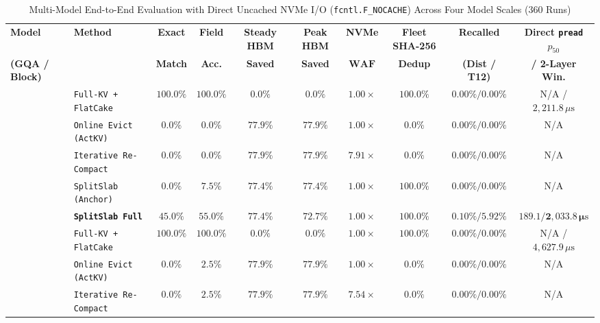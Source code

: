 \documentclass[final,5p,times,twocolumn]{elsarticle}
\theoremstyle{definition}
\theoremstyle{remark}
\newcommand{\WAF}{\operatorname{WAF}}
\begin{document}
\begin{table}[!t]
\centering
\caption{Multi-Model End-to-End Evaluation with Direct Uncached NVMe I/O (\texttt{fcntl.F\_NOCACHE}) Across Four Model Scales ($360$ Runs)}
\label{tab:multimodel}
\footnotesize
\renewcommand{\arraystretch}{1.12}
\setlength{\tabcolsep}{3.0pt}
\begin{tabular}{@{}llcccccccc@{}}
\toprule
\textbf{Model} & \textbf{Method} & \textbf{Exact} & \textbf{Field} & \textbf{Steady HBM} & \textbf{Peak HBM} & \textbf{NVMe} & \textbf{Fleet SHA-256} & \textbf{Recalled} & \textbf{Direct \texttt{pread} $p_{50}$} \\
\textbf{(GQA / Block)} & & \textbf{Match} & \textbf{Acc.} & \textbf{Saved} & \textbf{Saved} & $\mathbf{\WAF}$ & \textbf{Dedup} & \textbf{(Dist / T12)} & \textbf{/ 2-Layer Win.} \\
\midrule
{}
 & \texttt{Full-KV + FlatCake} & $100.0\%$ & $100.0\%$ & $0.0\%$ & $0.0\%$ & $1.00\times$ & $100.0\%$ & $0.00\% / 0.00\%$ & N/A / $2{,}211.8\,\mu\mathrm{s}$ \\
 & \texttt{Online Evict (ActKV)} & $0.0\%$ & $0.0\%$ & $77.9\%$ & $77.9\%$ & $1.00\times$ & $0.0\%$ & $0.00\% / 0.00\%$ & N/A \\
 & \texttt{Iterative Re-Compact} & $0.0\%$ & $0.0\%$ & $77.9\%$ & $77.9\%$ & $7.91\times$ & $0.0\%$ & $0.00\% / 0.00\%$ & N/A \\
 & \texttt{SplitSlab (Anchor)} & $0.0\%$ & $7.5\%$ & $77.4\%$ & $77.4\%$ & $1.00\times$ & $100.0\%$ & $0.00\% / 0.00\%$ & N/A \\
 & \textbf{\texttt{SplitSlab Full}} & $\mathbf{45.0\%}$ & $\mathbf{55.0\%}$ & $\mathbf{77.4\%}$ & $\mathbf{72.7\%}$ & $\mathbf{1.00\times}$ & $\mathbf{100.0\%}$ & $\mathbf{0.10\% / 5.92\%}$ & $\mathbf{189.1 / 2{,}033.8\,\mu\mathrm{s}}$ \\
\midrule
{}
 & \texttt{Full-KV + FlatCake} & $100.0\%$ & $100.0\%$ & $0.0\%$ & $0.0\%$ & $1.00\times$ & $100.0\%$ & $0.00\% / 0.00\%$ & N/A / $4{,}627.9\,\mu\mathrm{s}$ \\
 & \texttt{Online Evict (ActKV)} & $0.0\%$ & $2.5\%$ & $77.9\%$ & $77.9\%$ & $1.00\times$ & $0.0\%$ & $0.00\% / 0.00\%$ & N/A \\
 & \texttt{Iterative Re-Compact} & $0.0\%$ & $2.5\%$ & $77.9\%$ & $77.9\%$ & $7.54\times$ & $0.0\%$ & $0.00\% / 0.00\%$ & N/A \\

\end{tabular}
\end{table}
\end{document}
